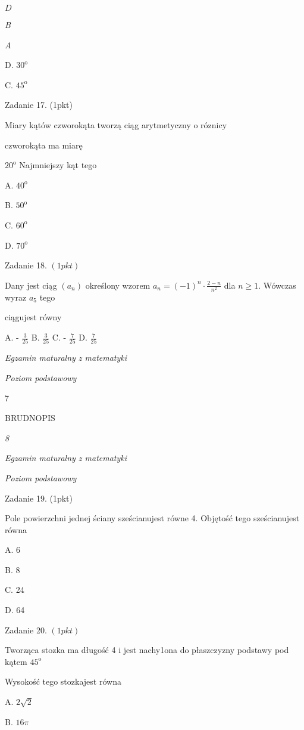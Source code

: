 \documentclass[a4paper,12pt]{article}
\begin{document}
$D$

{\it B}

{\it A}

D. $30^{\mathrm{o}}$

C. $45^{\mathrm{o}}$

Zadanie 17. (1pkt)

Miary kątów czworokąta tworzą ciąg arytmetyczny o róznicy

czworokąta ma miarę

$20^{\mathrm{o}}$ Najmniejszy kąt tego

A. $40^{\mathrm{o}}$

B. $50^{\mathrm{o}}$

C. $60^{\mathrm{o}}$

D. $70^{\mathrm{o}}$

Zadanie 18. $(1pkt)$

Dany jest ciąg $(a_{n})$ określony wzorem $a_{n}=(-1)^{n}\displaystyle \cdot\frac{2-n}{n^{2}}$ dla $n\geq 1$. Wówczas wyraz $a_{5}$ tego

ciągujest równy

A. - $\displaystyle \frac{3}{25}$ B. $\displaystyle \frac{3}{25}$ C. - $\displaystyle \frac{7}{25}$ D. $\displaystyle \frac{7}{25}$





{\it Egzamin maturalny z matematyki}

{\it Poziom podstawowy}

7

BRUDNOPIS





{\it 8}

{\it Egzamin maturalny z matematyki}

{\it Poziom podstawowy}

Zadanie 19. (1pkt)

Pole powierzchni jednej ściany sześcianujest równe 4. Objętość tego sześcianujest równa

A. 6

B. 8

C. 24

D. 64

Zadanie 20. $(1pkt)$

Tworząca stozka ma długość 4 i jest nachy1ona do płaszczyzny podstawy pod kątem $45^{\mathrm{o}}$

Wysokość tego stozkajest równa

A. $2\sqrt{2}$

B. $ 16\pi$
\end{document}

